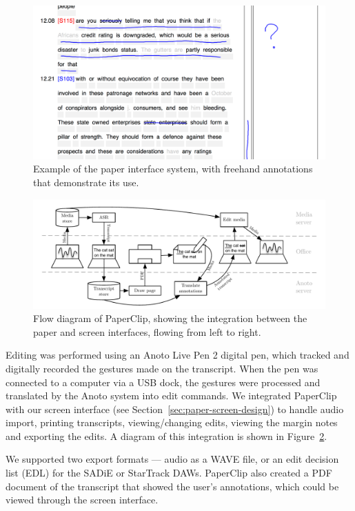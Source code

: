 \begin{figure}[p]
  \centering
  \includegraphics[width=\columnwidth]{figs/paper-interface-example-annotations.png}
  \caption{Example of the paper interface system, with freehand annotations that demonstrate its use.}
  \label{fig:paper-interface-example}
\end{figure}

\begin{figure}[p]
  \centering
  \includegraphics[width=\columnwidth]{figs/uist-sys-diagram}
  \caption{Flow diagram of PaperClip, showing the integration between the paper and screen interfaces, flowing from
  left to right.}
  \label{fig:paper-screen-integration}
\end{figure}


Editing was performed using an Anoto Live Pen 2 digital pen, which tracked and digitally recorded the gestures made on
the transcript.  When the pen was connected to a computer via a USB dock, the gestures were processed and translated by
the Anoto system into edit commands.  We integrated PaperClip with our screen interface (see
Section~\ref{sec:paper-screen-design}) to handle audio import, printing transcripts, viewing/changing edits, viewing
the margin notes and exporting the edits.  A diagram of this integration is shown in
Figure~\ref{fig:paper-screen-integration}.

We supported two export formats --- audio as a WAVE file, or an edit decision list (EDL) for the SADiE or StarTrack
DAWs.  PaperClip also created a PDF document of the transcript that showed the user's annotations, which could be
viewed through the screen interface.

